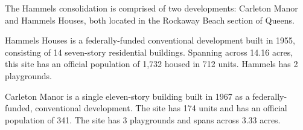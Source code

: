  

The Hammels consolidation is comprised of two developments: Carleton Manor and Hammels Houses, both located in the Rockaway Beach section of Queens. 

Hammels Houses is a federally-funded conventional development built in 1955, consisting of 14 seven-story residential buildings. Spanning across 14.16 acres, this site has an official population of 1,732 housed in 712 units. Hammels has 2 playgrounds. 

Carleton Manor is a single eleven-story building built in 1967 as a federally-funded, conventional development. The site has 174 units and has an official population of 341. The site has 3 playgrounds and spans across 3.33 acres. 